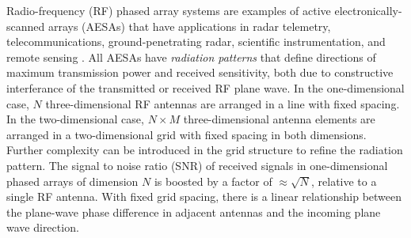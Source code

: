 \documentclass[../../main.tex]{subfiles}
\begin{document}
Radio-frequency (RF) phased array systems are examples of active electronically-scanned arrays (AESAs) that have applications in radar telemetry, telecommunications, ground-penetrating radar, scientific instrumentation, and remote sensing \cite{edm1}.  All AESAs have \textit{radiation patterns} that define directions of maximum transmission power and received sensitivity, both due to constructive interferance of the transmitted or received RF plane wave.  In the one-dimensional case, $N$ three-dimensional RF antennas are arranged in a line with fixed spacing.  In the two-dimensional case, $N \times M$ three-dimensional antenna elements are arranged in a two-dimensional grid with fixed spacing in both dimensions.  Further complexity can be introduced in the grid structure to refine the radiation pattern.  The signal to noise ratio (SNR) of received signals in one-dimensional phased arrays of dimension $N$ is boosted by a factor of $\approx \sqrt{N}$, relative to a single RF antenna.  With fixed grid spacing, there is a linear relationship between the plane-wave phase difference in adjacent antennas and the incoming plane wave direction.

\end{document}
